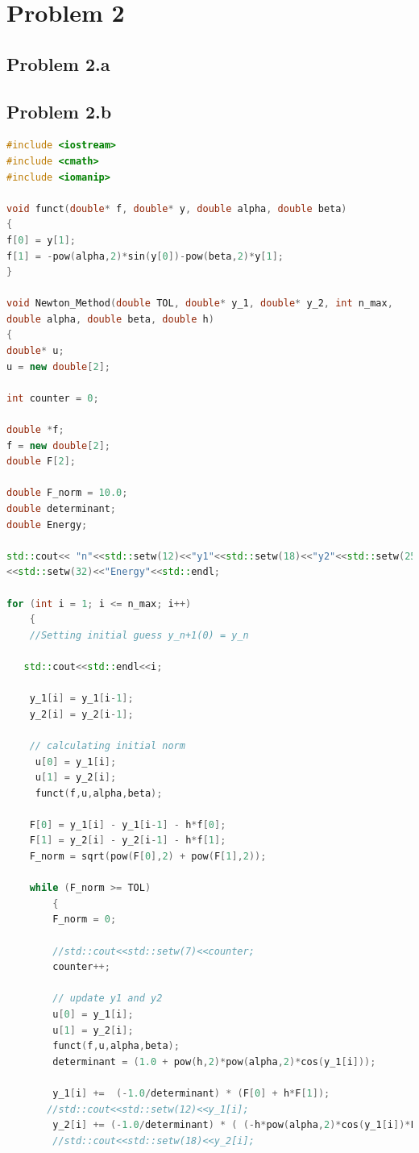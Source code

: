 \documentclass[a4paper,12pt,onecolumn,final]{article}
\begin{document}
\section*{Problem 2}
\subsection*{Problem 2.a}
\subsection*{Problem 2.b}
\begin{lstlisting}[language=C++]
#include <iostream>
#include <cmath>
#include <iomanip>

void funct(double* f, double* y, double alpha, double beta)
{
f[0] = y[1];
f[1] = -pow(alpha,2)*sin(y[0])-pow(beta,2)*y[1];
}

void Newton_Method(double TOL, double* y_1, double* y_2, int n_max, 
double alpha, double beta, double h)
{
double* u;
u = new double[2];

int counter = 0;

double *f;
f = new double[2];
double F[2];

double F_norm = 10.0;
double determinant;
double Energy;

std::cout<< "n"<<std::setw(12)<<"y1"<<std::setw(18)<<"y2"<<std::setw(25)<<"F_norm"
<<std::setw(32)<<"Energy"<<std::endl;

for (int i = 1; i <= n_max; i++)
    {
    //Setting initial guess y_n+1(0) = y_n

   std::cout<<std::endl<<i;

    y_1[i] = y_1[i-1];
    y_2[i] = y_2[i-1];

    // calculating initial norm
     u[0] = y_1[i];
     u[1] = y_2[i];
     funct(f,u,alpha,beta);

    F[0] = y_1[i] - y_1[i-1] - h*f[0];
    F[1] = y_2[i] - y_2[i-1] - h*f[1];
    F_norm = sqrt(pow(F[0],2) + pow(F[1],2));

    while (F_norm >= TOL)
        {
        F_norm = 0;

        //std::cout<<std::setw(7)<<counter;
        counter++;

        // update y1 and y2
        u[0] = y_1[i];
        u[1] = y_2[i];
        funct(f,u,alpha,beta);
        determinant = (1.0 + pow(h,2)*pow(alpha,2)*cos(y_1[i]));

        y_1[i] +=  (-1.0/determinant) * (F[0] + h*F[1]);
       //std::cout<<std::setw(12)<<y_1[i];
        y_2[i] += (-1.0/determinant) * ( (-h*pow(alpha,2)*cos(y_1[i])*F[0]) + F[1]);
        //std::cout<<std::setw(18)<<y_2[i];


\end{lstlisting}
\end{document}

